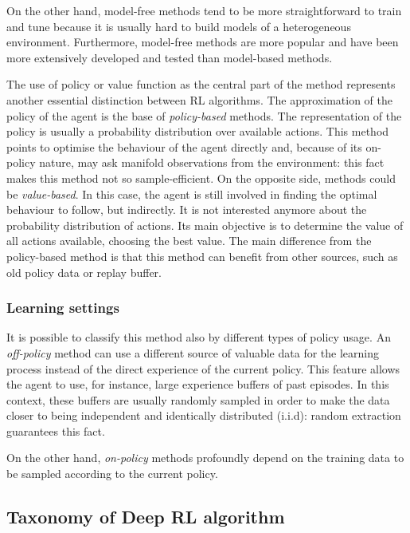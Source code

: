 On the other hand, model-free methods tend to be more straightforward to train and tune because it is usually hard to build models of a heterogeneous environment. Furthermore, model-free methods are more popular and have been more extensively developed and tested than model-based methods.


The use of policy or value function as the central part of the method represents another essential distinction between RL algorithms.
The approximation of the policy of the agent is the base of \textit{policy-based} methods. The representation of the policy is usually a probability distribution over available actions. This method points to optimise the behaviour of the agent directly and, because of its on-policy nature, may ask manifold observations from the environment: this fact makes this method not so sample-efficient.
On the opposite side, methods could be \textit{value-based}. In this case, the agent is still involved in finding the optimal behaviour to follow, but indirectly. It is not interested anymore about the probability distribution of actions. Its main objective is to determine the value of all actions available, choosing the best value. The main difference from the policy-based method is that this method can benefit from other sources, such as old policy data or replay buffer.

\subsubsection{Learning settings}

It is possible to classify this method also by different types of policy usage.
An \textit{off-policy} method can use a different source of valuable data for the learning process instead of the direct experience of the current policy. This feature allows the agent to use, for instance, large experience buffers of past episodes. In this context, these buffers are usually randomly sampled in order to make the data closer to being independent and identically distributed (i.i.d): random extraction guarantees this fact.

On the other hand, \textit{on-policy} methods profoundly depend on the training data to be sampled according to the current policy.


\subsection{Taxonomy of Deep RL algorithm}


